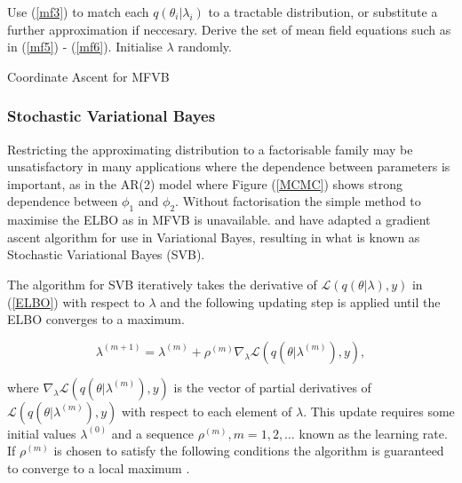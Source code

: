 \documentclass[12pt,a4paper]{article}%
\numberwithin{equation}{section}
\begin{document}
\vspace{2mm}

\begin{algorithm}[H]
 Use (\ref{mf3}) to match each $q(\theta_i|\lambda_i)$ to a tractable distribution, or substitute a further approximation if neccesary.\;
 Derive the set of mean field equations such as in (\ref{mf5}) - (\ref{mf6}).\;
 Initialise $\lambda$ randomly. \;
 \caption{Coordinate Ascent for MFVB}
  \label{alg:algorithm1}
\end{algorithm}

\subsubsection{Stochastic Variational Bayes}

Restricting the approximating distribution to a factorisable family may be unsatisfactory in many applications where the dependence between parameters is important, as in the AR(2) model where Figure (\ref{MCMC}) shows strong dependence between $\phi_1$ and $\phi_2$. Without factorisation the simple method to maximise the ELBO as in MFVB is unavailable. \citet{Paisley2012} and \citet{Ranganath2014} have adapted a gradient ascent algorithm for use in Variational Bayes, resulting in what is known as Stochastic Variational Bayes (SVB).

The algorithm for SVB iteratively takes the  derivative of $\mathcal{L}(q(\theta | \lambda), y)$ in (\ref{ELBO}) with respect to $\lambda$ and the following updating step is applied until the ELBO converges to a maximum.

\begin{equation}
\label{SGA1}
\lambda^{(m+1)} = \lambda^{(m)} + \rho^{(m)} \nabla_{\lambda} \mathcal{L}(q(\theta | \lambda^{(m)}), y),
\end{equation}

where $\nabla_{\lambda}\mathcal{L}(q(\theta | \lambda^{(m)}), y)$ is the vector of partial derivatives of $\mathcal{L}(q(\theta | \lambda^{(m)}), y)$ with respect to each element of $\lambda$. This update requires some initial values $\lambda^{(0)}$ and a sequence $\rho^{(m)}, m = 1, 2, \dots$ known as the learning rate. If $\rho^{(m)}$ is chosen to satisfy the following conditions the algorithm is guaranteed to converge to a local maximum \citep{Robbins1951}.
\end{document}
